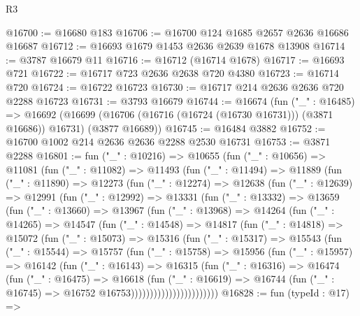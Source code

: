 \begin{lexlean}{R3}
\begin{coremodule}
@16700 := @16680 @183
@16706 := @16700 @124 @1685 @2657 @2636 @16686 @16687
@16712 := @16693 @1679 @1453 @2636 @2639 @1678 @13908
@16714 := @3787 @16679 @11
@16716 := @16712 (@16714 @1678)
@16717 := @16693 @721
@16722 := @16717 @723 @2636 @2638 @720 @4380
@16723 := @16714 @720
@16724 := @16722 @16723
@16730 := @16717 @214 @2636 @2636 @720 @2288 @16723
@16731 := @3793 @16679
@16744 := @16674
    (fun ("_" : @16485) =>
    @16692 (@16699 (@16706 (@16716 (@16724 (@16730 @16731))) (@3871 @16686)) @16731) (@3877 @16689))
@16745 := @16484 @3882
@16752 := @16700 @1002 @214 @2636 @2636 @2288 @2530 @16731
@16753 := @3871 @2288
@16801 := fun ("_" : @10216) =>
  @10655
    (fun ("_" : @10656) =>
    @11081
      (fun ("_" : @11082) =>
      @11493
        (fun ("_" : @11494) =>
        @11889
          (fun ("_" : @11890) =>
          @12273
            (fun ("_" : @12274) =>
            @12638
              (fun ("_" : @12639) =>
              @12991
                (fun ("_" : @12992) =>
                @13331
                  (fun ("_" : @13332) =>
                  @13659
                    (fun ("_" : @13660) =>
                    @13967
                      (fun ("_" : @13968) =>
                      @14264
                        (fun ("_" : @14265) =>
                        @14547
                          (fun ("_" : @14548) =>
                          @14817
                            (fun ("_" : @14818) =>
                            @15072
                              (fun ("_" : @15073) =>
                              @15316
                                (fun ("_" : @15317) =>
                                @15543
                                  (fun ("_" : @15544) =>
                                  @15757
                                    (fun ("_" : @15758) =>
                                    @15956
                                      (fun ("_" : @15957) =>
                                      @16142
                                        (fun ("_" : @16143) =>
                                        @16315
                                          (fun ("_" : @16316) =>
                                          @16474
                                            (fun ("_" : @16475) =>
                                            @16618
                                              (fun ("_" : @16619) =>
                                              @16744
                                                (fun ("_" : @16745) =>
                                                @16752 @16753)))))))))))))))))))))))
@16828 := fun (typeId : @17) =>

\end{coremodule}
\end{lexlean}
